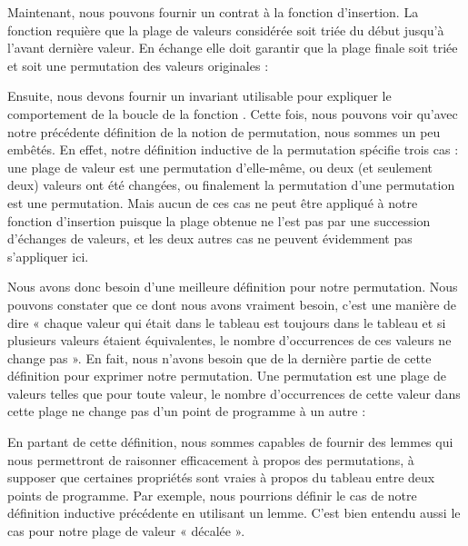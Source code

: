 


Maintenant, nous pouvons fournir un contrat à la fonction d'insertion. La
fonction requière que la plage de valeurs considérée soit triée du début jusqu'à
l'avant dernière valeur. En échange elle doit garantir que la plage finale soit
triée et soit une permutation des valeurs originales :






Ensuite, nous devons fournir un invariant utilisable pour expliquer le comportement
de la boucle de la fonction . Cette fois, nous pouvons voir
qu'avec notre précédente définition de la notion de permutation, nous sommes un
peu embêtés. En effet, notre définition inductive de la permutation spécifie trois
cas : une plage de valeur est une permutation d'elle-même, ou deux (et seulement
deux) valeurs ont été changées, ou finalement la permutation d'une permutation est
une permutation. Mais aucun de ces cas ne peut être appliqué à notre fonction
d'insertion puisque la plage obtenue ne l'est pas par une succession d'échanges de
valeurs, et les deux autres cas ne peuvent évidemment pas s'appliquer ici.



Nous avons donc besoin d'une meilleure définition pour notre permutation. Nous
pouvons constater que ce dont nous avons vraiment besoin, c'est une manière de
dire « chaque valeur qui était dans le tableau est toujours dans le tableau et
si plusieurs valeurs étaient équivalentes, le nombre d'occurrences de ces valeurs
ne change pas ». En fait, nous n'avons besoin que de la dernière partie de cette
définition pour exprimer notre permutation. Une permutation est une plage de valeurs
telles que pour toute valeur, le nombre d'occurrences de cette valeur dans cette
plage ne change pas d'un point de programme à un autre :






En partant de cette définition, nous sommes capables de fournir des lemmes qui
nous permettront de raisonner efficacement à propos des permutations, à
supposer que certaines propriétés sont vraies à propos du tableau entre deux
points de programme. Par exemple, nous pourrions définir le cas 
de notre définition inductive précédente en utilisant un lemme. C'est bien
entendu aussi le cas pour notre plage de valeur « décalée ».



